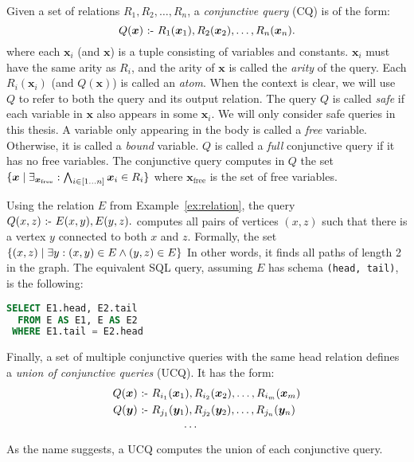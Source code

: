 Given a set of relations $R_1, R_2, \ldots, R_n$, 
 a {\em conjunctive query} (CQ) is of the form:
\[
  Q(\bm{x}) \text{ :- } R_1(\bm{x}_1), R_2(\bm{x}_2), \ldots, R_n(\bm{x}_n).
\]
where each $\bm{x}_i$ (and $\bm{x}$) is a tuple consisting of variables and constants.
$\bm{x}_i$ must have the same arity as $R_i$,
 and the arity of $\bm{x}$ is called the {\em arity} of the query.
Each $R_i({\bm x_i})$ (and $Q({\bm x})$) is called an {\em atom}.
When the context is clear, 
 we will use $Q$ to refer to both the query and its output relation.
The query $Q$ is called {\em safe} if each variable in $\bm{x}$ also appears in some $\bm{x}_i$.
We will only consider safe queries in this thesis.
A variable only appearing in the body is called a {\em free} variable.
Otherwise, it is called a {\em bound} variable. 
$Q$ is called a {\em full} conjunctive query if it has no free variables.
The conjunctive query computes in $Q$ the set 
 $\{{\bm x}\mid{\exists_{\bm x_\text{free}} : \bigwedge_{i \in [1 \ldots n]} {\bm x_i} \in R_i}\}$
 where ${\bm x_\text{free}}$ is the set of free variables.

\begin{ex}
\label{ex:cq}
Using the relation $E$ from Example~\ref{ex:relation},
 the query $Q(x, z) \text{ :- } E(x, y), E(y, z).$
 computes all pairs of vertices $(x, z)$ 
 such that there is a vertex $y$ 
 connected to both $x$ and $z$.
Formally, the set $\{{(x, z)}\mid{\exists y : (x, y) \in E \wedge (y, z) \in E}\}$
In other words, it finds all paths of length 2 in the graph.
The equivalent SQL query, assuming $E$ has schema \texttt{(head, tail)}, is the following:
\begin{lstlisting}[language=SQL]
SELECT E1.head, E2.tail
  FROM E AS E1, E AS E2
 WHERE E1.tail = E2.head
\end{lstlisting}
\end{ex}

Finally, a set of multiple conjunctive queries with the same head relation
 defines a {\em union of conjunctive queries} (UCQ).
It has the form:
\begin{align*}
  Q(\bm{x}) & \text{ :- } R_{i_1}(\bm{x}_1), R_{i_2}(\bm{x}_2), \ldots, R_{i_m}(\bm{x}_m) \\
  Q(\bm{y}) & \text{ :- } R_{j_1}(\bm{y}_1), R_{j_2}(\bm{y}_2), \ldots, R_{j_n}(\bm{y}_n) \\
  & \hspace{4em} \cdots
\end{align*}
As the name suggests, a UCQ computes the union of each conjunctive query.

